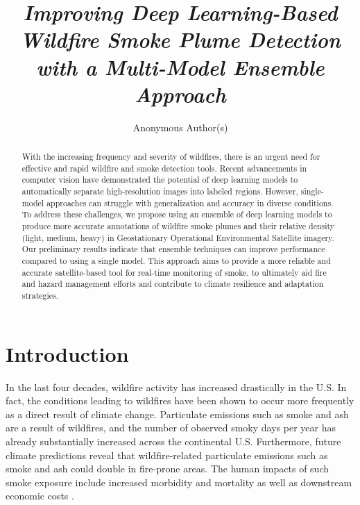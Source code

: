 \documentclass{article}
\title{\textit{Improving Deep Learning-Based Wildfire Smoke Plume Detection with a Multi-Model Ensemble Approach}}
\author{%
Anonymous Author(s)
}
\begin{document}
\maketitle

\begin{abstract}
With the increasing frequency and severity of wildfires, there is an urgent need for effective and rapid wildfire and smoke detection tools. Recent advancements in computer vision have demonstrated the potential of deep learning models to automatically separate high-resolution images into labeled regions. However, single-model approaches can struggle with generalization and accuracy in diverse conditions. To address these challenges, we propose using an ensemble of deep learning models to produce more accurate annotations of wildfire smoke plumes and their relative density (light, medium, heavy) in Geostationary Operational Environmental Satellite imagery. Our preliminary results indicate that ensemble techniques can improve performance compared to using a single model. This approach aims to provide a more reliable and accurate satellite-based tool for real-time monitoring of smoke, to ultimately aid fire and hazard management efforts and contribute to climate resilience and adaptation strategies.
\end{abstract}

\section{Introduction}
In the last four decades, wildfire activity has increased drastically in the U.S. In fact, the conditions leading to wildfires have been shown to occur more frequently as a direct result of climate change. Particulate emissions such as smoke and ash are a result of wildfires, and the number of observed smoky days per year has already substantially increased across the continental U.S.
Furthermore, future climate predictions reveal that wildfire-related particulate emissions such as smoke and ash could double in fire-prone areas. The human impacts of such smoke exposure include increased morbidity and mortality as well as downstream economic costs \citep{wildfire-risk}.
\end{document}

